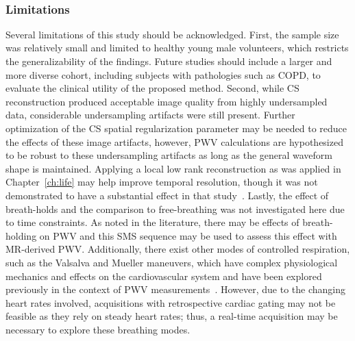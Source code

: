 ~\subsubsection{Limitations}
Several limitations of this study should be acknowledged. First, the sample size was relatively small and limited to healthy young male volunteers, which restricts the generalizability of the findings. Future studies should include a larger and more diverse cohort, including subjects with pathologies such as COPD, to evaluate the clinical utility of the proposed method. Second, while CS reconstruction produced acceptable image quality from highly undersampled data, considerable undersampling artifacts were still present. Further optimization of the CS spatial regularization parameter may be needed to reduce the effects of these image artifacts, however, PWV calculations are hypothesized to be robust to these undersampling artifacts as long as the general waveform shape is maintained. Applying a local low rank reconstruction as was applied in Chapter~\ref{ch:life} may help improve temporal resolution, though it was not demonstrated to have a substantial effect in that study~\cite{haldarLowrankApproximationsDynamic2011,leeLLORMALocalLowrank2016}. Lastly, the effect of breath-holds and the comparison to free-breathing was not investigated here due to time constraints. As noted in the literature, there may be effects of breath-holding on PWV and this SMS sequence may be used to assess this effect with MR-derived PWV\@. Additionally, there exist other modes of controlled respiration, such as the Valsalva and Mueller maneuvers, which have complex physiological mechanics and effects on the cardiovascular system and have been explored previously in the context of PWV measurements~\cite{pstrasValsalvaManoeuvrePhysiology2016b, gaddumBeattobeatVariationPulse2014a}. However, due to the changing heart rates involved, acquisitions with retrospective cardiac gating may not be feasible as they rely on steady heart rates; thus, a real-time acquisition may be necessary to explore these breathing modes.

